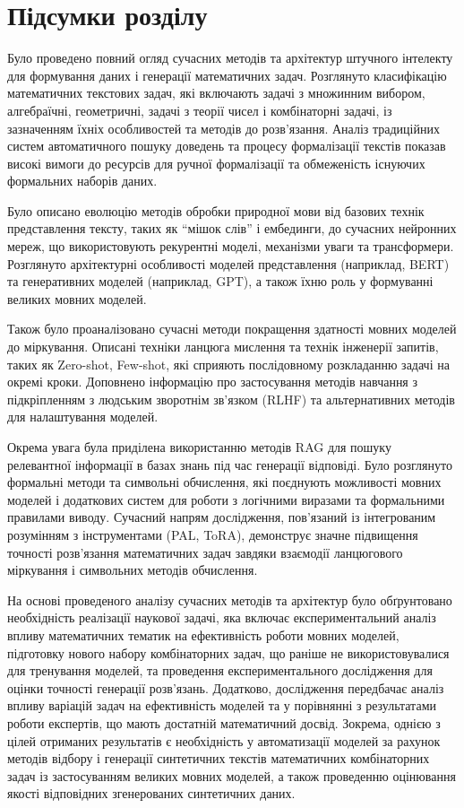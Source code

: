 \section{Підсумки розділу}

Було проведено повний огляд сучасних методів та архітектур штучного інтелекту для формування даних і генерації математичних задач. Розглянуто класифікацію математичних текстових задач, які включають задачі з множинним вибором, алгебраїчні, геометричні, задачі з теорії чисел і комбінаторні задачі, із зазначенням їхніх особливостей та методів до розв’язання. Аналіз традиційних систем автоматичного пошуку доведень та процесу формалізації текстів показав високі вимоги до ресурсів для ручної формалізації та обмеженість існуючих формальних наборів даних.

Було описано еволюцію методів обробки природної мови від базових технік представлення тексту, таких як ``мішок слів'' і ембединги, до сучасних нейронних мереж, що використовують рекурентні моделі, механізми уваги та трансформери. Розглянуто архітектурні особливості моделей представлення (наприклад, BERT) та генеративних моделей (наприклад, GPT), а також їхню роль у формуванні великих мовних моделей.

Також було проаналізовано сучасні методи покращення здатності мовних моделей до міркування. Описані техніки ланцюга мислення та технік інженерії запитів, таких як Zero-shot, Few-shot, які сприяють послідовному розкладанню задачі на окремі кроки. Доповнено інформацію про застосування методів навчання з підкріпленням з людським зворотнім зв’язком (RLHF) та альтернативних методів для налаштування моделей.

Окрема увага була приділена використанню методів RAG для пошуку релевантної інформації в базах знань під час генерації відповіді. Було розглянуто формальні методи та символьні обчислення, які поєднують можливості мовних моделей і додаткових систем для роботи з логічними виразами та формальними правилами виводу. Сучасний напрям дослідження, пов’язаний із інтегрованим розумінням з інструментами (PAL, ToRA), демонструє значне підвищення точності розв’язання математичних задач завдяки взаємодії ланцюгового міркування і символьних методів обчислення.

На основі проведеного аналізу сучасних методів та архітектур було обґрунтовано необхідність реалізації наукової задачі, яка включає експериментальний аналіз впливу математичних тематик на ефективність роботи мовних моделей, підготовку нового набору комбінаторних задач, що раніше не використовувалися для тренування моделей, та проведення експериментального дослідження для оцінки точності генерації розв’язань. Додатково, дослідження передбачає аналіз впливу варіацій задач на ефективність моделей та у порівнянні з результатами роботи експертів, що мають достатній математичний досвід. Зокрема, однією з цілей отриманих результатів є необхідність у автоматизації моделей за рахунок методів відбору і генерації синтетичних текстів математичних комбінаторних задач із застосуванням великих мовних моделей, а також проведенню оцінювання якості відповідних згенерованих синтетичних даних.
